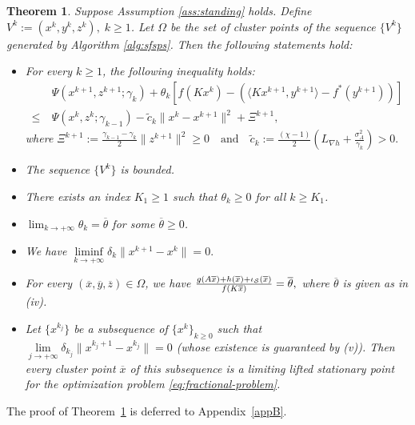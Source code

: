 \documentclass[11pt]{article}
\numberwithin{equation}{section}
\newtheorem{theorem}{Theorem}[section]
\newcommand{\nn}{\nonumber}
\DeclareMathOperator{\dom}{dom}
\begin{document}
\begin{theorem}
\label{PriTheo2R}
Suppose Assumption \ref{ass:standing} holds. Define $V^k := (x^k,y^k,z^k), \; k\geq 1$. Let $\Omega$ be the set of  cluster points of the sequence $\{{ V}^k\}$ generated by Algorithm \ref{alg:sfsps}.  Then the following statements hold:
\begin{itemize}
\item[(i)] For every $k \geq 1$, the following inequality holds:
\begin{align*}\label{desineqRR}
& \ \Psi({ x}^{k+1}, { z}^{k+1}; \gamma_k)
+ \theta_k \left[f(K{ x}^k)-\left( \langle K{ x}^{k+1},{ y}^{k+1} \rangle - f^*({ y}^{k+1})\right)\right]\nn \\
\leq & \ \Psi({ x}^{k}, { z}^{k}; \gamma_{k-1})
-{\widetilde c}_{k}\|{ x}^k-{ x}^{k+1}\|^2 + \Xi^{k+1},
\end{align*}
 where
$
\Xi^{k+1} := \frac{\gamma_{k-1}-\gamma_{k}}{2}\|{ z}^{k+1}\|^2 \geq 0 \quad \mbox{and} \quad
 {\widetilde c}_{k}:=\frac{(\chi-1)}{2}\left(L_{\nabla h} +\frac{\sigma_A^2}{\gamma_{k}}\right) >0.
$

\item[(ii)] The sequence $\{{ V}^k\}$ is bounded.
\item[(iii)] There exists an index $K_1 \geq 1$ such that $\theta_k\ge 0$ for all $k\ge K_1$.
\item[(iv)] $\lim_{k\to+\infty}\theta_k=\overline{\theta}$ {for some $\overline{\theta} \ge 0$.}
\item[(v)] We have $\liminf\limits_{k\to+\infty}\delta_{k}\|{ x}^{k+1}-{ x}^k\|=0.$
\end{itemize}
\begin{itemize}
\item[(vi)]
{For every $(\overline{ x},{\overline{ y}},{\overline{ z}}) \in \Omega$, we have }
$\frac{g(A{\overline{ x}})+h({\overline{ x}})+\iota_{\cal S}(\overline{ x})}{f(K{\overline{ x}})}={\overline{ \theta}},$
{where $\overline{\theta}$ is given as in {(iv)}.}
\item[(vii)]
Let \(\{{ x}^{k_j}\}\) be a subsequence of $\{x^k\}_{k\ge 0}$ such that
$
\lim\limits_{j \to +\infty} \delta_{k_j} \|{ x}^{k_j+1} - { x}^{k_j}\| = 0$ (whose existence is guaranteed by {(v)}).  Then every cluster point \(\overline{ x}\) of this subsequence is a limiting lifted stationary point for the optimization problem \eqref{eq:fractional-problem}.
\end{itemize}
\end{theorem}
The proof of Theorem~\ref{PriTheo2R} is deferred to Appendix~\ref{appB}.
\end{document}
